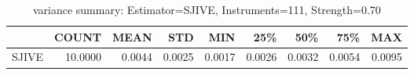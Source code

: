 \begin{table}[ht]
\centering
\caption{variance summary: Estimator=SJIVE, Instruments=111, Strength=0.70}
\begin{tabular}{lrrrrrrrr}
\toprule
 & COUNT & MEAN & STD & MIN & 25\% & 50\% & 75\% & MAX \\
\midrule
SJIVE & 10.0000 & 0.0044 & 0.0025 & 0.0017 & 0.0026 & 0.0032 & 0.0054 & 0.0095 \\
\bottomrule
\end{tabular}
\end{table}
